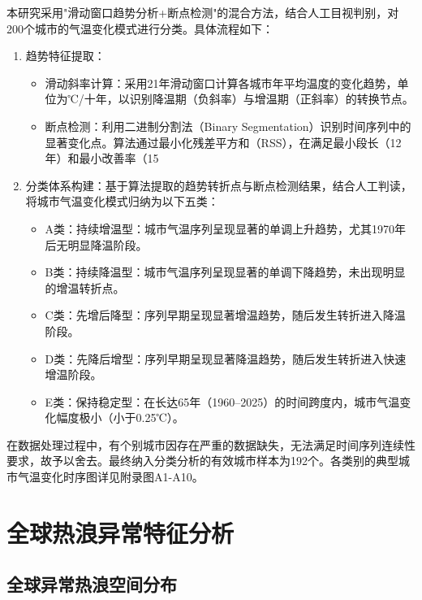 \documentclass[a4paper,UTF8,scheme=chinese,zihao=-4,twoside]{ctexart}
\makeatletter
\newcommand{\初号}{\zihao{0}}
\newcommand{\小初}{\zihao{-0}}
\newcommand{\一号}{\zihao{1}}
\newcommand{\小一}{\zihao{-1}}
\newcommand{\二号}{\zihao{2}}
\newcommand{\小二}{\zihao{-2}}
\newcommand{\三号}{\zihao{3}}
\newcommand{\小三}{\zihao{-3}}
\newcommand{\四号}{\zihao{4}}
\newcommand{\小四}{\zihao{-4}}
\newcommand{\五号}{\zihao{5}}
\newcommand{\小五}{\zihao{-5}}
\newcommand{\六号}{\zihao{6}}
\newcommand{\小六}{\zihao{-6}}
\newcommand{\七号}{\zihao{7}}
\newcommand{\八号}{\zihao{8}}
\newcommand{\宋体}{\songti}
\newcommand{\黑体}{\heiti}
\newcommand{\仿宋}{\fangsong}
\newcommand{\楷书}{\kaishu}
\newcommand{\粗体}{\bfseries}
\newcommand{\斜体}{\itshape}
\newcommand\下划线[2][6em]{\hskip1pt\underline{\hb@xt@ #1{\hss#2\hss}}\hskip3pt}
\makeatother
\begin{document}
本研究采用"滑动窗口趋势分析+断点检测"的混合方法，结合人工目视判别，对200个城市的气温变化模式进行分类。具体流程如下：

\begin{enumerate}
    \item 趋势特征提取：
        \begin{itemize}
            \item 滑动斜率计算：采用21年滑动窗口计算各城市年平均温度的变化趋势，单位为℃/十年，以识别降温期（负斜率）与增温期（正斜率）的转换节点。
            \item 断点检测：利用二进制分割法（Binary Segmentation）识别时间序列中的显著变化点。算法通过最小化残差平方和（RSS），在满足最小段长（12年）和最小改善率（15%
        \end{itemize}
    \item 分类体系构建：基于算法提取的趋势转折点与断点检测结果，结合人工判读，将城市气温变化模式归纳为以下五类：
        \begin{itemize}
            \item A类：持续增温型：城市气温序列呈现显著的单调上升趋势，尤其1970年后无明显降温阶段。
            \item B类：持续降温型：城市气温序列呈现显著的单调下降趋势，未出现明显的增温转折点。
            \item C类：先增后降型：序列早期呈现显著增温趋势，随后发生转折进入降温阶段。
            \item D类：先降后增型：序列早期呈现显著降温趋势，随后发生转折进入快速增温阶段。
            \item E类：保持稳定型：在长达65年（1960–2025）的时间跨度内，城市气温变化幅度极小（小于0.25℃）。
        \end{itemize}
\end{enumerate}

在数据处理过程中，有个别城市因存在严重的数据缺失，无法满足时间序列连续性要求，故予以舍去。最终纳入分类分析的有效城市样本为192个。各类别的典型城市气温变化时序图详见附录图A1-A10。

\section{全球热浪异常特征分析}

\subsection{全球异常热浪空间分布}
\end{document}
